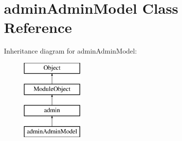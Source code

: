 \hypertarget{classadminAdminModel}{\section{admin\+Admin\+Model Class Reference}
\label{classadminAdminModel}
}
Inheritance diagram for admin\+Admin\+Model\+:\begin{figure}[H]
\begin{center}
\leavevmode
\includegraphics[height=4.000000cm]{classadminAdminModel}
\end{center}
\end{figure}
